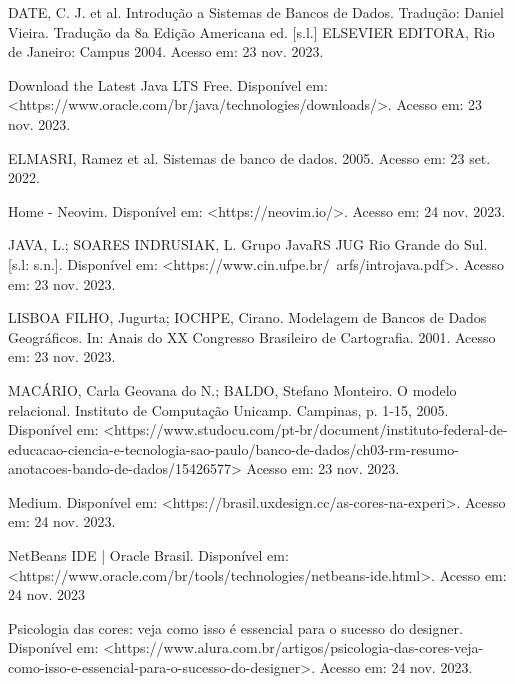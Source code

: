 \documentclass[a4paper,12pt]{article}
\begin{document}
\noindent DATE, C. J. et al. Introdução a Sistemas de Bancos de Dados. Tradução: Daniel Vieira. Tradução da 8a Edição Americana ed. [s.l.] 
ELSEVIER EDITORA, Rio de Janeiro: Campus 2004. Acesso em: 23 nov. 2023. \linebreak

\noindent Download the Latest Java LTS Free. Disponível em: <https://www.oracle.com/br/java/technologies/downloads/>. 
Acesso em: 23 nov. 2023. \linebreak

\noindent ELMASRI, Ramez et al. Sistemas de banco de dados. 2005. Acesso em: 23 set. 2022. \linebreak

\noindent Home - Neovim. Disponível em: <https://neovim.io/>. Acesso em: 24 nov. 2023. \linebreak

\noindent JAVA, L.; SOARES INDRUSIAK, L. Grupo JavaRS JUG Rio Grande do Sul. [s.l: s.n.]. 
Disponível em: <https://www.cin.ufpe.br/~arfs/introjava.pdf>. Acesso em: 23 nov. 2023. \linebreak

\noindent LISBOA FILHO, Jugurta; IOCHPE, Cirano. Modelagem de Bancos de Dados Geográficos. In: Anais do XX Congresso Brasileiro de Cartografia. 2001. Acesso em: 23 nov. 2023. \linebreak

\noindent MACÁRIO, Carla Geovana do N.; BALDO, Stefano Monteiro. O modelo relacional. Instituto de Computação Unicamp. Campinas, p. 1-15, 2005. 
Disponível em: <https://www.studocu.com/pt-br/document/instituto-federal-de-educacao-ciencia-e-tecnologia-sao-paulo/banco-de-dados/ch03-rm-resumo-anotacoes-bando-de-dados/15426577> 
Acesso em: 23 nov. 2023. \linebreak

\noindent Medium. Disponível em: <https://brasil.uxdesign.cc/as-cores-na-experi>. Acesso em: 24 nov. 2023. \linebreak

\noindent NetBeans IDE | Oracle Brasil. Disponível em: <https://www.oracle.com/br/tools/technologies/netbeans-ide.html>. Acesso em: 24 nov. 2023 \linebreak

\noindent Psicologia das cores: veja como isso é essencial para o sucesso do designer. 
Disponível em: <https://www.alura.com.br/artigos/psicologia-das-cores-veja-como-isso-e-essencial-para-o-sucesso-do-designer>.
Acesso em: 24 nov. 2023. \linebreak 
\end{document}
